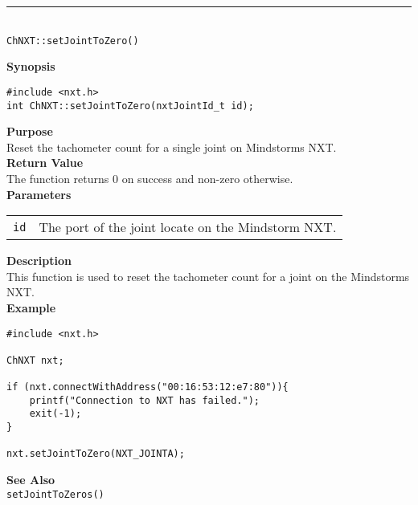 \noindent
\vspace{5pt}
\rule{4.5in}{0.015in}\\
\noindent
{\LARGE \texttt{ChNXT::setJointToZero()} }\\


\noindent
{\bf Synopsis}
\begin{lstlisting}
#include <nxt.h>
int ChNXT::setJointToZero(nxtJointId_t id);
\end{lstlisting}

\noindent
{\bf Purpose}\\
Reset the tachometer count for a single joint on Mindstorms NXT.\\

\noindent
{\bf Return Value}\\
The function returns 0 on success and non-zero otherwise.\\

\noindent
{\bf Parameters}\\
\vspace{-0.1in}
\begin{description}
\item
\begin{tabular}{p{20mm}p{135mm}}
\texttt{id} &The port of the joint locate on the Mindstorm NXT.\\
\end{tabular}
\end{description}

\noindent
{\bf Description}\\
This function is used to reset the tachometer count for a joint on the Mindstorms NXT.\\

\noindent
{\bf Example}
\begin{lstlisting}
#include <nxt.h> 

ChNXT nxt;

if (nxt.connectWithAddress("00:16:53:12:e7:80")){
    printf("Connection to NXT has failed.");
    exit(-1);
}
    
nxt.setJointToZero(NXT_JOINTA);
\end{lstlisting}

\noindent
{\bf See Also}\\
\texttt{setJointToZeros()}\\
